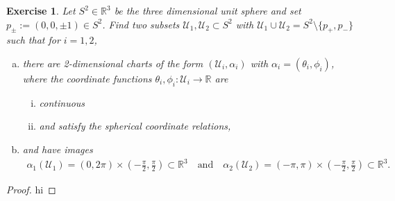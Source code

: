 \documentclass{book}
\theoremstyle{custom_definition}
\newtheorem{exercise}{Exercise}
\theoremstyle{custom_theorem}
\begin{document}
    \begin{exercise}
        Let \(S^2 \in \mathbb{R}^3\) be the three dimensional unit sphere and set \(p_{\pm} := (0, 0, \pm 1) \in S^2\). Find two subsets \(\mathcal{U}_1, \mathcal{U}_2 \subset S^2\) with \(\mathcal{U}_1 \cup \mathcal{U}_2 = S^2 \setminus \{p_+, p_-\}\) such that for \(i = 1, 2\),
        \begin{enumerate}[a)]
            \item there are 2-dimensional charts of the form \((\mathcal{U}_i, \alpha_i)\) with \(\alpha_i = (\theta_i, \phi_i)\), where the coordinate functions \(\theta_i, \phi_i: \mathcal{U}_i \longrightarrow \mathbb{R}\) are
            \begin{enumerate}[i)]
                \item continuous
                \item and satisfy the spherical coordinate relations,
            \end{enumerate}
            \item and have images
            \begin{align}
                \alpha_1(\mathcal{U}_1) = (0, 2 \pi) \times (-\frac{\pi}{2}, \frac{\pi}{2}) \subset \mathbb{R}^3 \quad \text{and} \quad \alpha_2(\mathcal{U}_2) = (-\pi, \pi) \times (-\frac{\pi}{2}, \frac{\pi}{2}) \subset \mathbb{R}^3 \text{.}
            \end{align}
        \end{enumerate}
    \end{exercise}
    \begin{proof}
        hi
    \end{proof}
\end{document}
